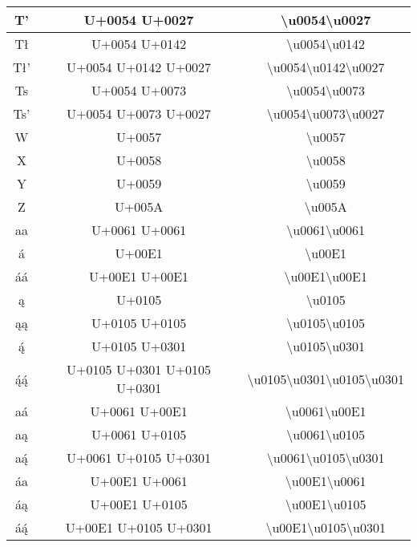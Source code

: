 \begin{longtable}{|c|c|c|}
T' & U+0054 U+0027 & \textbackslash{}u0054\textbackslash{}u0027 \\ \hline
Tł & U+0054 U+0142 & \textbackslash{}u0054\textbackslash{}u0142 \\ \hline
Tł' & U+0054 U+0142 U+0027 & \textbackslash{}u0054\textbackslash{}u0142\textbackslash{}u0027 \\ \hline
Ts & U+0054 U+0073 & \textbackslash{}u0054\textbackslash{}u0073 \\ \hline
Ts' & U+0054 U+0073 U+0027 & \textbackslash{}u0054\textbackslash{}u0073\textbackslash{}u0027 \\ \hline
W & U+0057 & \textbackslash{}u0057 \\ \hline
X & U+0058 & \textbackslash{}u0058 \\ \hline
Y & U+0059 & \textbackslash{}u0059 \\ \hline
Z & U+005A & \textbackslash{}u005A \\ \hline

aa & U+0061 U+0061 & \textbackslash{}u0061\textbackslash{}u0061 \\ \hline
á & U+00E1 & \textbackslash{}u00E1 \\ \hline
áá & U+00E1 U+00E1 & \textbackslash{}u00E1\textbackslash{}u00E1 \\ \hline
ą & U+0105 & \textbackslash{}u0105 \\ \hline
ąą & U+0105 U+0105 & \textbackslash{}u0105\textbackslash{}u0105 \\ \hline
ą́ & U+0105 U+0301 & \textbackslash{}u0105\textbackslash{}u0301 \\ \hline
ą́ą́ & U+0105 U+0301 U+0105 U+0301 & \textbackslash{}u0105\textbackslash{}u0301\textbackslash{}u0105\textbackslash{}u0301 \\ \hline

aá & U+0061 U+00E1 & \textbackslash{}u0061\textbackslash{}u00E1 \\ \hline
aą & U+0061 U+0105 & \textbackslash{}u0061\textbackslash{}u0105 \\ \hline
aą́ & U+0061 U+0105 U+0301 & \textbackslash{}u0061\textbackslash{}u0105\textbackslash{}u0301 \\ \hline

áa & U+00E1 U+0061  & \textbackslash{}u00E1\textbackslash{}u0061 \\ \hline
áą & U+00E1 U+0105 & \textbackslash{}u00E1\textbackslash{}u0105 \\ \hline
áą́ & U+00E1 U+0105 U+0301 & \textbackslash{}u00E1\textbackslash{}u0105\textbackslash{}u0301 \\ \hline


\end{longtable}
